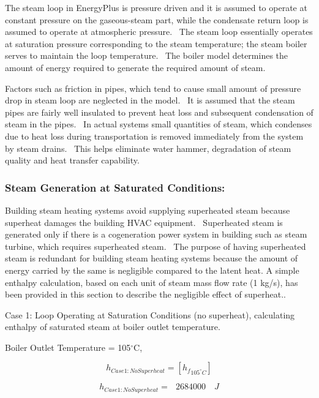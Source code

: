 The steam loop in EnergyPlus is pressure driven and it is assumed to operate at constant pressure on the gaseous-steam part, while the condensate return loop is assumed to operate at atmospheric pressure.~ The steam loop essentially operates at saturation pressure corresponding to the steam temperature; the steam boiler serves to maintain the loop temperature.~ The boiler model determines the amount of energy required to generate the required amount of steam.

Factors such as friction in pipes, which tend to cause small amount of pressure drop in steam loop are neglected in the model.~ It is assumed that the steam pipes are fairly well insulated to prevent heat loss and subsequent condensation of steam in the pipes.~ In actual systems small quantities of steam, which condenses due to heat loss during transportation is removed immediately from the system by steam drains.~ This helps eliminate water hammer, degradation of steam quality and heat transfer capability.

\subsubsection{Steam Generation at Saturated Conditions:}\label{steam-generation-at-saturated-conditions}

Building steam heating systems avoid supplying superheated steam because superheat damages the building HVAC equipment.~ Superheated steam is generated only if there is a cogeneration power system in building such as steam turbine, which requires superheated steam.~ The purpose of having superheated steam is redundant for building steam heating systems because the amount of energy carried by the same is negligible compared to the latent heat. A simple enthalpy calculation, based on each unit of steam mass flow rate (1 kg/s), has been provided in this section to describe the negligible effect of superheat..

Case 1: Loop Operating at Saturation Conditions (no superheat), calculating enthalpy of saturated steam at boiler outlet temperature.

Boiler Outlet Temperature = 105\(^{\circ}\)C,

\begin{equation}
{h_{Case1:NoSuperheat}} = [{h_f}_{{{105}^ \circ }C}]
\end{equation}

\begin{equation}
{h_{Case1:NoSuperheat}} = \,\,\,\,2684000\,\,\,\,\,\,J
\end{equation}

